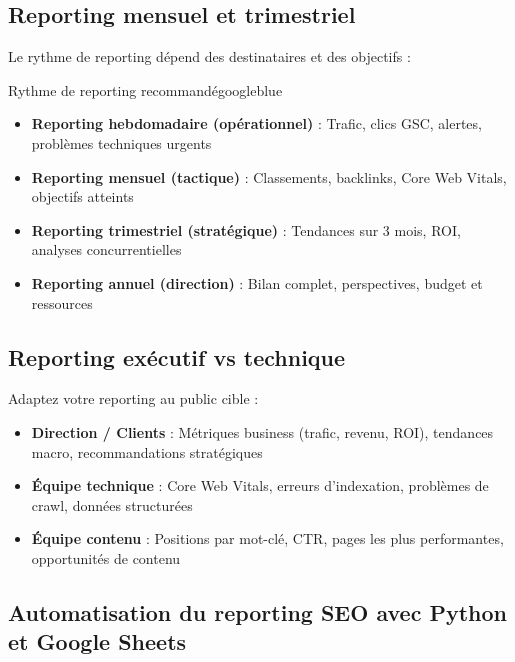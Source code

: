 \documentclass[12pt,a4paper,twoside]{report}
\begin{document}
\subsection{Reporting mensuel et trimestriel}

Le rythme de reporting dépend des destinataires et des objectifs :

\begin{mybox}{Rythme de reporting recommandé}{googleblue}
\begin{itemize}
    \item \textbf{Reporting hebdomadaire (opérationnel)} : Trafic, clics GSC, alertes, problèmes techniques urgents
    \item \textbf{Reporting mensuel (tactique)} : Classements, backlinks, Core Web Vitals, objectifs atteints
    \item \textbf{Reporting trimestriel (stratégique)} : Tendances sur 3 mois, ROI, analyses concurrentielles
    \item \textbf{Reporting annuel (direction)} : Bilan complet, perspectives, budget et ressources
\end{itemize}
\end{mybox}

\subsection{Reporting exécutif vs technique}

Adaptez votre reporting au public cible :
\begin{itemize}
    \item \textbf{Direction / Clients} : Métriques business (trafic, revenu, ROI), tendances macro, recommandations stratégiques
    \item \textbf{Équipe technique} : Core Web Vitals, erreurs d'indexation, problèmes de crawl, données structurées
    \item \textbf{Équipe contenu} : Positions par mot-clé, CTR, pages les plus performantes, opportunités de contenu
\end{itemize}

\subsection{Automatisation du reporting SEO avec Python et Google Sheets}
\end{document}
